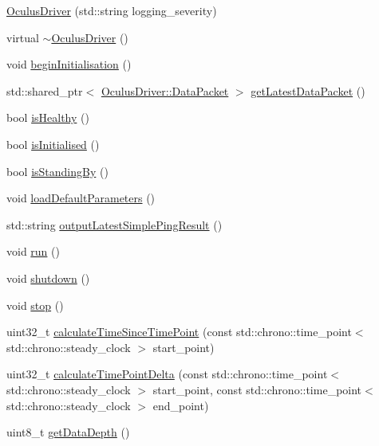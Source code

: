 \begin{DoxyCompactItemize}
\item 
\hyperlink{classOculusDriver_a375971727905f97e740960404d344650}{Oculus\+Driver} (std\+::string logging\+\_\+severity)
\item 
virtual \hyperlink{classOculusDriver_aa5a4dc2ce813dd838fcea5713ae801d7}{$\sim$\+Oculus\+Driver} ()
\item 
void \hyperlink{classOculusDriver_ab55c1e754f2afae202fb518fb57beb91}{begin\+Initialisation} ()
\item 
std\+::shared\+\_\+ptr$<$ \hyperlink{structOculusDriver_1_1DataPacket}{Oculus\+Driver\+::\+Data\+Packet} $>$ \hyperlink{classOculusDriver_ad2c11be70c8769b5a2e1701fece192f5}{get\+Latest\+Data\+Packet} ()
\item 
bool \hyperlink{classOculusDriver_a6ff0df7535000bcfd824936eea60b8ba}{is\+Healthy} ()
\item 
bool \hyperlink{classOculusDriver_aa6922efe578105ad450566dbeca81fce}{is\+Initialised} ()
\item 
bool \hyperlink{classOculusDriver_aeaea5c301e29068eefd2ad691a46d149}{is\+Standing\+By} ()
\item 
void \hyperlink{classOculusDriver_a062f28cdd182b2e9837a8ab47fbf9d92}{load\+Default\+Parameters} ()
\item 
std\+::string \hyperlink{classOculusDriver_a0d5e4a70a4961e98a99691ab4ea2f206}{output\+Latest\+Simple\+Ping\+Result} ()
\item 
void \hyperlink{classOculusDriver_aabb55ee02ccf7d8c42ab042532ec674c}{run} ()
\item 
void \hyperlink{classOculusDriver_a4687f949c3547241c317504856b76201}{shutdown} ()
\item 
void \hyperlink{classOculusDriver_a76f26d85e497e941a59b6f5d6bca957f}{stop} ()
\item 
uint32\+\_\+t \hyperlink{classOculusDriver_a38c77276ca90f7f4c76c125c377c12af}{calculate\+Time\+Since\+Time\+Point} (const std\+::chrono\+::time\+\_\+point$<$ std\+::chrono\+::steady\+\_\+clock $>$ start\+\_\+point)
\item 
uint32\+\_\+t \hyperlink{classOculusDriver_ade10c3b36326aaa76f572ebf08b3fcea}{calculate\+Time\+Point\+Delta} (const std\+::chrono\+::time\+\_\+point$<$ std\+::chrono\+::steady\+\_\+clock $>$ start\+\_\+point, const std\+::chrono\+::time\+\_\+point$<$ std\+::chrono\+::steady\+\_\+clock $>$ end\+\_\+point)
\item 
uint8\+\_\+t \hyperlink{classOculusDriver_aed562fa0262b63b40dfa9ae6c72264e2}{get\+Data\+Depth} ()

\end{DoxyCompactItemize}
